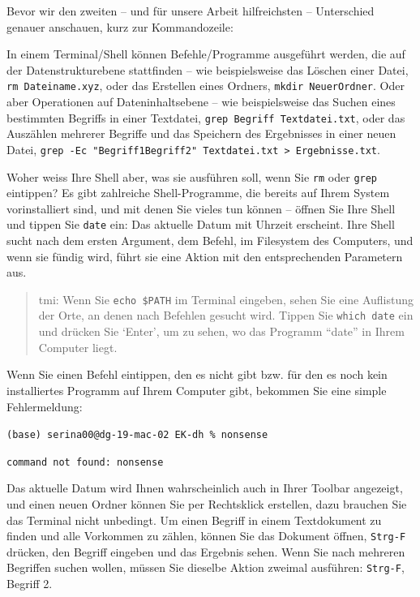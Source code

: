 \documentclass[
  letterpaper,
]{book}
\begin{document}
Bevor wir den zweiten -- und für unsere Arbeit hilfreichsten --
Unterschied genauer anschauen, kurz zur Kommandozeile:

In einem Terminal/Shell können Befehle/Programme ausgeführt werden, die
auf der Datenstrukturebene stattfinden -- wie beispielsweise das Löschen
einer Datei, \texttt{rm\ Dateiname.xyz}, oder das Erstellen eines
Ordners, \texttt{mkdir\ NeuerOrdner}. Oder aber Operationen auf
Dateninhaltsebene -- wie beispielsweise das Suchen eines bestimmten
Begriffs in einer Textdatei, \texttt{grep\ Begriff\ Textdatei.txt}, oder
das Auszählen mehrerer Begriffe und das Speichern des Ergebnisses in
einer neuen Datei,
\texttt{grep\ -Ec\ "Begriff1\textbar{}Begriff2"\ Textdatei.txt\ \textgreater{}\ Ergebnisse.txt}.

Woher weiss Ihre Shell aber, was sie ausführen soll, wenn Sie
\texttt{rm} oder \texttt{grep} eintippen? Es gibt zahlreiche
Shell-Programme, die bereits auf Ihrem System vorinstalliert sind, und
mit denen Sie vieles tun können -- öffnen Sie Ihre Shell und tippen Sie
\texttt{date} ein: Das aktuelle Datum mit Uhrzeit erscheint. Ihre Shell
sucht nach dem ersten Argument, dem Befehl, im Filesystem des Computers,
und wenn sie fündig wird, führt sie eine Aktion mit den entsprechenden
Parametern aus.

\begin{quote}
tmi: Wenn Sie \texttt{echo\ \$PATH} im Terminal eingeben, sehen Sie eine
Auflistung der Orte, an denen nach Befehlen gesucht wird. Tippen Sie
\texttt{which\ date} ein und drücken Sie `Enter', um zu sehen, wo das
Programm ``date'' in Ihrem Computer liegt.
\end{quote}

Wenn Sie einen Befehl eintippen, den es nicht gibt bzw. für den es noch
kein installiertes Programm auf Ihrem Computer gibt, bekommen Sie eine
simple Fehlermeldung:

\texttt{(base)\ serina00@dg-19-mac-02\ EK-dh\ \%\ nonsense}

\texttt{command\ not\ found:\ nonsense}

Das aktuelle Datum wird Ihnen wahrscheinlich auch in Ihrer Toolbar
angezeigt, und einen neuen Ordner können Sie per Rechtsklick erstellen,
dazu brauchen Sie das Terminal nicht unbedingt. Um einen Begriff in
einem Textdokument zu finden und alle Vorkommen zu zählen, können Sie
das Dokument öffnen, \texttt{Strg-F} drücken, den Begriff eingeben und
das Ergebnis sehen. Wenn Sie nach mehreren Begriffen suchen wollen,
müssen Sie dieselbe Aktion zweimal ausführen: \texttt{Strg-F}, Begriff
2.
\end{document}
